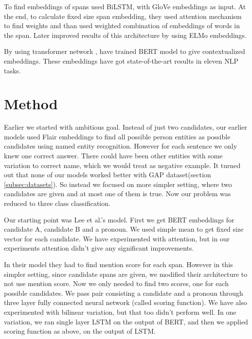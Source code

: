\documentclass[11pt,a4paper]{article}
\begin{document}
To find embeddings of spans \citet{lee2017end} used BiLSTM, with GloVe \cite{pennington2014glove} embeddings as input. At the end, to calculate fixed size span embedding, they used attention mechanism to find weights and than used weighted combination of embeddings of words in the span. Later \citet{Peters:2018} improved results of this architecture by using ELMo embeddings.

By using transformer network \cite{vaswani2017attention}, \citet{devlin2018bert} have trained BERT model to give contextualized embeddings. These embeddings have got state-of-the-art results in eleven NLP tasks.

\section{Method}
\label{sec:method}
Earlier we started with ambitious goal. Instead of just two candidates, our earlier models used Flair embeddings to find all possible person entities as possible candidates using named entity recognition. However for each sentence we only knew one correct answer. There could have been other entities with some variation to correct name, which we would treat as negative example. It turned out that none of our models worked better with GAP dataset(section \ref{subsec:datasets}). So instead we focused on more simpler setting, where two candidates are given and at most one of them is true. Now our problem was reduced to three class classification.

Our starting point was Lee et al.'s model. First we get BERT embeddings for candidate A, candidate B and a pronoun. We used simple mean to get fixed size vector for each candidate. We have experimented with attention, but in our experiments attention didn't give any significant improvements.

In their model they had to find mention score for each span. However in this simpler setting, since candidate spans are given, we modified their architecture to not use mention score. Now we only needed to find two scores, one for each possible candidates.  We pass pair consisting a candidate and a pronoun through three layer fully connected neural network (called scoring function).  We have also experimented with bilinear variation, but that too didn't perform well. In one variation, we ran single layer LSTM on the output of BERT, and then we applied scoring function as above, on the output of LSTM.
\end{document}
